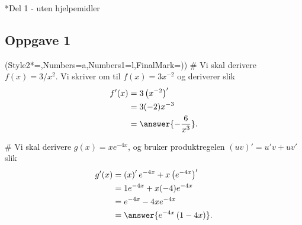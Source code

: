 


\newcommand{\fagkode}{S2}
\newcommand{\semesteraar}{våren 2014}
\newcommand{\forfatter}{Tommy O.}
\newcommand{\dokumenttittel}{Løsningsforslag -- Eksamen \fagkode, \semesteraar}


\newcommand{\logonavn}




\section*{Del 1 - uten hjelpemidler}
\subsection*{Oppgave 1}
\begin{easylist}[enumerate]
\ListProperties(Style2*=,Numbers=a,Numbers1=l,FinalMark={)})
# Vi skal derivere $f(x) = 3/x^2$. 
Vi skriver om til $f(x) = 3x^{-2}$ og deriverer slik
\begin{align*}
	f'(x) &= 3 \left(x^{-2}\right)' \\
	      & = 3 (-2)x^{-3} \\
	      & = \answer{-\frac{6}{x^3}}.
\end{align*}


# Vi skal derivere $g(x) = xe^{-4x}$, og bruker produktregelen
$(uv)' = u'v + uv'$ slik
\begin{align*}
	g'(x) &= \left(x \right)' e^{-4x} +x \left( e^{-4x} \right)' \\
	& = 1 e^{-4x} + x (-4) e^{-4x}  \\
	& = e^{-4x} -4x e^{-4x}  \\
	& =  \answer{e^{-4x} \left( 1 - 4x\right) }.
\end{align*}
\end{easylist}

